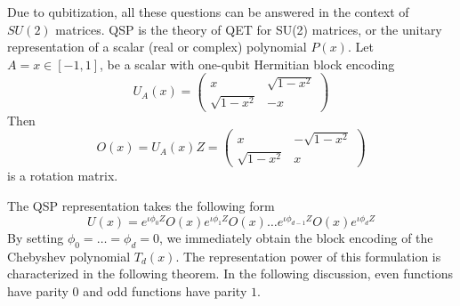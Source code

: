 \documentclass[12pt, oneside]{book}
\theoremstyle{definition}
\theoremstyle{definition}
\theoremstyle{remark}
\begin{document}
Due to qubitization, all these questions can be answered in the context of $SU(2)$ matrices. QSP is the theory of QET for SU(2) matrices, or the unitary representation of a scalar (real or complex) polynomial $P(x)$. Let $A = x \in [-1,1]$, be a scalar with one-qubit Hermitian block encoding
\[
U_A(x)=\begin{pmatrix} x & \sqrt{1-x^2} \\ \sqrt{1-x^2} & -x \end{pmatrix}
\]
Then
\[
O(x) = U_A(x)Z=\begin{pmatrix} x & -\sqrt{1-x^2}\\ \sqrt{1-x^2} & x \end{pmatrix}
\]
is a rotation matrix.

The QSP representation takes the following form
\[
U(x) = e^{\iota \phi_0Z}O(x)e^{\iota \phi_1Z}O(x)\ldots e^{\iota \phi_{d-1}Z}O(x)e^{\iota \phi_dZ}
\]
By setting $\phi_0=\ldots=\phi_d=0$, we immediately obtain the block encoding of the Chebyshev polynomial $T_d(x)$. The representation power of this formulation is characterized in the following theorem. In the following discussion, even functions have parity $0$ and odd functions have parity $1$.
\end{document}
